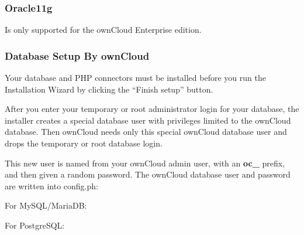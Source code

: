 \documentclass[letterpaper,10pt,english]{sphinxmanual}
\begin{document}
\subsubsection{Oracle11g}
\label{installation/installation_wizard:oracle11g}
Is only supported for the ownCloud Enterprise edition.


\subsubsection{Database Setup By ownCloud}
\label{installation/installation_wizard:database-setup-by-owncloud}
Your database and PHP connectors must be installed before you run the Installation Wizard
by clicking the ``Finish setup'' button.

After you enter your temporary or root administrator login for your database, the installer
creates a special database user with privileges limited to the ownCloud database. Then ownCloud
needs only this special ownCloud database user and drops the temporary or root database login.

This new user is named from your ownCloud admin user, with an {\color{red}\bfseries{}oc\_} prefix, and then given a
random password.  The ownCloud database user and password are written into config.ph:

\begin{DUlineblock}{0em}
\item[] For MySQL/MariaDB:
\item[]
\begin{DUlineblock}{\DUlineblockindent}
\item[] 
\item[] 
\end{DUlineblock}
\end{DUlineblock}

\begin{DUlineblock}{0em}
\item[] For PostgreSQL:
\item[]
\begin{DUlineblock}{\DUlineblockindent}
\item[] 
\item[] 
\end{DUlineblock}
\end{DUlineblock}
\end{document}
